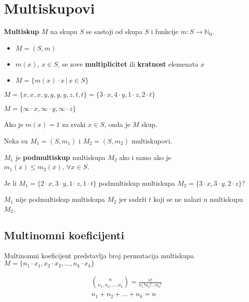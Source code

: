 \section{Multiskupovi}

\textbf{Multiskup} $M$ na skupu $S$ se sastoji od skupa $S$ i funkcije
$m:S\to\mathbb{N}_0$.

\begin{itemize}
    \item $M = (S, m)$
    \item $m(x),\, x\in S$, se zove \textbf{multiplicitet} ili \textbf{kratnost} elemenata $x$
    \item $M = \{m(x) \cdot x \,|\, x \in S\}$
\end{itemize}

\begin{example}
    $M = \{x,x,x,y,y,y,y,z,t,t\} = \{3\cdot x, 4 \cdot y, 1 \cdot z, 2 \cdot t\}$
\end{example}

\begin{example}
    $M = \{\infty \cdot x, \infty \cdot y, \infty \cdot z\}$
\end{example}

Ako je $m(x) = 1$ za svaki $x\in S$, onda je $M$ skup.

\bigskip
Neka su $M_1 = (S, m_1)$ i $M_2 = (S, m_2)$ multiskupovi.

$M_1$ je \textbf{podmultiskup} multiskupa $M_2$ ako i samo ako je $m_1(x) \leq m_2(x),\, \forall x \in S$.

\begin{example}
    Je li $M_1 = \{2\cdot x, 3 \cdot y, 1 \cdot z, 1 \cdot t\}$ podmultiskup
    multiskupa $M_2 = \{3\cdot x, 3 \cdot y, 2 \cdot z\}$?
\end{example}

$M_1$ nije podmultiskup multiskupa $M_2$ jer sadrži $t$ koji se ne nalazi u
multiskupu $M_2$.

\subsection{Multinomni koeficijenti}

Multinomni koeficijent predstavlja broj permutacija multiskupa $M = \{n_1\cdot x_1, x_2 \cdot x_2, \dots, n_k \cdot x_k\}$

\begin{gather*}
    \binom{n}{n_1, n_2, \dots, n_k} = \frac{n!}{n_1!n_2!\dots n_k!}\\
    n_1+n_2+\dots+n_k = n
\end{gather*}

